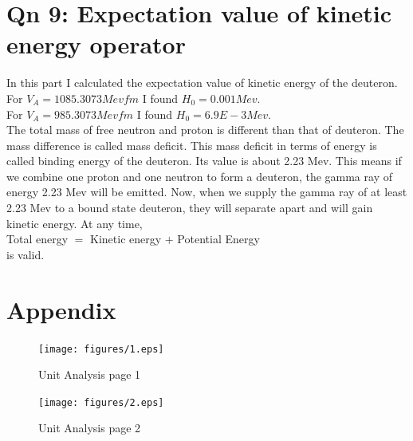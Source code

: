 \documentclass[11pt,a4paper,english]{article}
\begin{document}
\section{Qn 9: Expectation value of kinetic energy operator }
    In this part I calculated the expectation value of kinetic energy of the deuteron.
    For $V_A = 1085.3073 Mevfm$ I found $H_0=0.001Mev$.\\
    For $V_A = 985.3073 Mevfm$ I found $H_0=6.9E-3Mev$.\\
    The total mass of free neutron and proton is different than that of deuteron.
    The mass difference is called mass deficit. This mass deficit in terms of
    energy is called binding energy of the deuteron. Its value is about 2.23 Mev.
    This means if we combine one proton and one neutron to form a deuteron, the gamma
    ray of energy 2.23 Mev will be emitted. Now, when we supply the gamma ray of 
    at least 2.23 Mev to a bound state deuteron, they will separate apart and will gain 
    kinetic energy. At any time,\\
    Total energy $=$ Kinetic energy $+$ Potential Energy\\
    is valid.
\section{Appendix}

	\begin{figure}[!ht]
	\centering
	\texttt{[image: figures/1.eps]}
	\caption{Unit Analysis page 1 }
	\end{figure}
	\clearpage
	\begin{figure}[!ht]
	\centering
	\texttt{[image: figures/2.eps]}
	\caption{Unit Analysis page 2 }
	\end{figure}

    
\end{document}
